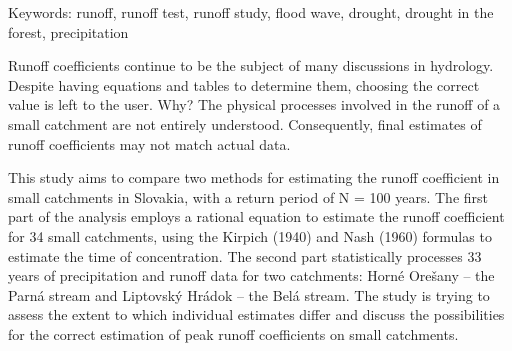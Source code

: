Keywords: runoff, runoff test, runoff study, flood wave, drought, drought in the forest, precipitation
\newpage{}
{}
\begin{flushleft}







\end{flushleft}

\noindent

Runoff coefficients continue to be the subject of many discussions in hydrology. Despite having equations and tables to determine them, choosing the correct value is left to the user. Why? The physical processes involved in the runoff of a small catchment are not entirely understood. Consequently, final estimates of runoff coefficients may not match actual data.

This study aims to compare two methods for estimating the runoff coefficient in small catchments in Slovakia, with a return period of N = 100 years. The first part of the analysis employs a rational equation to estimate the runoff coefficient for 34 small catchments, using the Kirpich (1940) and Nash (1960) formulas to estimate the time of concentration. The second part statistically processes 33 years of precipitation and runoff data for two catchments: Horné Orešany – the Parná stream and Liptovský Hrádok – the Belá stream. The study is trying to assess the extent to which individual estimates differ and discuss the possibilities for the correct estimation of peak runoff coefficients on small catchments. 


